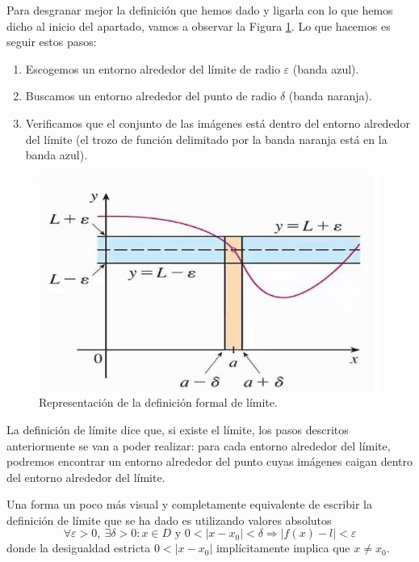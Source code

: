 \documentclass[10pt,a4paper,openright]{book}
\theoremstyle{break}
\begin{document}
Para desgranar mejor la definición que hemos dado y ligarla con lo que hemos dicho al inicio del apartado, vamos a observar la Figura \ref{fig:definicion_formal_limite}. Lo que hacemos es seguir estos pasos:
\begin{enumerate}
\item Escogemos un entorno alrededor del límite de radio $\varepsilon$ (banda azul).
\item Buscamos un entorno alrededor del punto de radio $\delta$ (banda naranja).
\item Verificamos que el conjunto de las imágenes está dentro del entorno alrededor del límite (el trozo de función delimitado por la banda naranja está en la banda azul).
\end{enumerate}

\begin{figure}[h]
\centering
\includegraphics[scale=0.40]{limite}
\caption{Representación de la definición formal de límite.}
\label{fig:definicion_formal_limite}
\end{figure}

La definición de límite dice que, si existe el límite, los pasos descritos anteriormente se van a poder realizar: para cada entorno alrededor del límite, podremos encontrar un entorno alrededor del punto cuyas imágenes caigan dentro del entorno alrededor del límite.

Una forma un poco más visual y completamente equivalente de escribir la definición de límite que se ha dado es utilizando valores absolutos
\[
\forall \varepsilon>0, \ \exists \delta>0 : x\in D \mbox{ y } 0 < |x-x_0| < \delta\Rightarrow |f(x)-l|<\varepsilon
\]
donde la desigualdad estricta $0 < |x-x_0|$ implícitamente implica que $x \neq x_0$.
\end{document}
